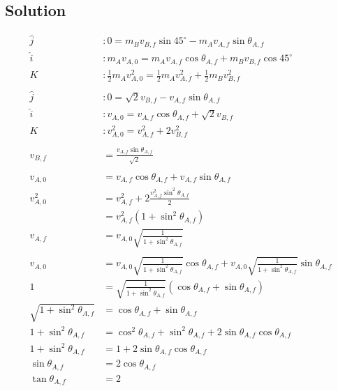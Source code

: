 \documentclass[solutions]{esg8012pset}
\begin{document}
\subsection{Solution}
  \begin{align*}
  \hat j& : 0 = m_B v_{B,f}\sin 45^{\circ} - m_A v_{A, f}\sin\theta_{A, f} \\
  \hat i& : m_A v_{A, 0} = m_A v_{A, f}\cos \theta_{A, f} + m_B v_{B, f}\cos 45^{\circ} \\
  K& : \frac{1}{2}m_A v_{A, 0}^2 = \frac{1}{2}m_Av_{A,f}^2 + \frac{1}{2}m_B v_{B, f}^2 \\
  \\
  \hat j& : 0 = \sqrt{2} v_{B,f} - v_{A, f}\sin\theta_{A, f} \\
  \hat i& : v_{A, 0} = v_{A, f}\cos \theta_{A, f} + \sqrt{2}v_{B, f} \\
  K& : v_{A, 0}^2 = v_{A,f}^2 + 2 v_{B, f}^2 \\
  \\
  v_{B,f} & = \frac{v_{A, f}\sin\theta_{A, f}}{\sqrt{2}} \\
  \\
  v_{A, 0} & = v_{A, f}\cos \theta_{A, f} + v_{A, f}\sin\theta_{A, f} \\
  v_{A, 0}^2 & = v_{A,f}^2 + 2 \frac{v_{A, f}^2\sin^2\theta_{A, f}}{2} \\
    & = v_{A,f}^2\left(1 + \sin^2\theta_{A, f}\right) \\
  v_{A, f} & = v_{A, 0}\sqrt{\frac{1}{1 + \sin^2\theta_{A, f}}} \\
  \\
  v_{A, 0} & = v_{A, 0}\sqrt{\frac{1}{1 + \sin^2\theta_{A, f}}}\cos \theta_{A, f} + v_{A, 0}\sqrt{\frac{1}{1 + \sin^2\theta_{A, f}}}\sin\theta_{A, f} \\
  1 & = \sqrt{\frac{1}{1 + \sin^2\theta_{A, f}}}\left(\cos \theta_{A, f} + \sin\theta_{A, f}\right) \\
  \sqrt{1 + \sin^2\theta_{A, f}} & = \cos \theta_{A, f} + \sin\theta_{A, f} \\
  1 + \sin^2\theta_{A, f} & = \cos^2 \theta_{A, f} + \sin^2\theta_{A, f} + 2 \sin \theta_{A, f}\cos \theta_{A, f}\\
  1 + \sin^2\theta_{A, f} & = 1 + 2 \sin \theta_{A, f}\cos \theta_{A, f}\\
  \sin\theta_{A, f} & = 2 \cos \theta_{A, f}\\
  \tan\theta_{A, f} & = 2

\end{align*}
\end{document}
